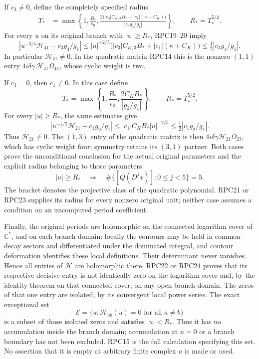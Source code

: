 \documentclass[11pt,a4paper]{article}
\begin{document}
If $c_3\ne0$, define the completely specified radius
\[
 \begin{split}
 T_*&=\max\left\{1,\frac{B_*}{\epsilon_0},
 \frac{2\bigl(|c_3|C_{K,3}B_*+|c_1|(\kappa+C_K)\bigr)}
 {|c_3g_4/g_1|}\right\},\qquad R_*=T_*^{5/2}.
 \end{split}
 \tag{RPC21}
\]
For every $u$ on its original branch with $|u|\ge R_*$,
RPC19--20 imply
\[
 \left|u^{-3/5}\mathcal H_{41}-c_3g_4/g_1\right|
 \le |u|^{-2/5}\bigl(|c_3|C_{K,3}B_*
                           +|c_1|(\kappa+C_K)\bigr)
 \le\tfrac12|c_3g_4/g_1|.
 \tag{RPC22}
\]
In particular $\mathcal H_{41}\ne0$. In the quadratic matrix
RPC14 this is the nonzero $(1,1)$ entry
$4i\delta\gamma\,\mathcal H_{41}\Omega_{41}$, whose cyclic
weight is two.

If $c_3=0$, then $c_1\ne0$. In this case define
\[
 T_* =\max\left\{1,\frac{B_*}{\epsilon_0},
                   \frac{2C_KB_*}{|g_2/g_1|}\right\},
 \qquad R_*=T_*^{5/2}.
 \tag{RPC23}
\]
For every $|u|\ge R_*$, the same estimates give
\[
 \left|u^{-1/5}\mathcal H_{21}-c_1g_2/g_1\right|
       \le |c_1|C_KB_*|u|^{-2/5}
       \le\tfrac12|c_1g_2/g_1|.
 \tag{RPC24}
\]
Thus $\mathcal H_{21}\ne0$. The $(1,3)$ entry of the quadratic
matrix is then $4i\delta\gamma\mathcal H_{21}\Omega_{23}$,
which has cyclic weight four; symmetry retains its $(3,1)$ partner.
Both cases prove the unconditional conclusion for the actual original
parameters and the explicit radius belonging to those parameters:
\[
 \boxed{\quad |u|\ge R_*\quad\Longrightarrow\quad
       \#\{[Q(D^jx)]:0\le j<5\}=5.\quad}
 \tag{RPC25}
\]
The bracket denotes the projective class of the quadratic polynomial.
RPC21 or RPC23 supplies its radius for every nonzero original unit;
neither case assumes a condition on an uncomputed period coefficient.

Finally, the original periods are holomorphic on the connected
logarithm cover of $\mathbb C^*$, and on each branch domain: locally the contours may
be held in common decay sectors and differentiated under the dominated
integral, and contour deformation identifies these local definitions.
Their determinant never vanishes. Hence all entries of $\mathcal H$
are holomorphic there. RPC22 or RPC24 proves that its respective
decisive entry is not identically zero on the logarithm cover and,
by the identity theorem on that connected cover, on any open branch domain. The zeros
of that one entry are isolated, by its convergent local power series.
The exact exceptional set
\[
 \mathcal E=\{u:\mathcal H_{ab}(u)=0\text{ for all }a\ne b\}
 \tag{RPC26}
\]
is a subset of those isolated zeros and satisfies $|u|<R_*$.
Thus it has no accumulation inside the branch domain; accumulation
at $u=0$ or a branch boundary has not been excluded. RPC15 is the
full calculation specifying this set. No assertion that it is empty
at arbitrary finite complex $u$ is made or used.
\end{document}
